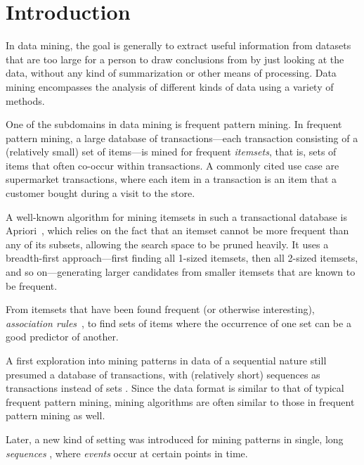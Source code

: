 \chapter{Introduction}

In data mining, the goal is generally to extract useful information from datasets that are too large for a person to draw conclusions from by just looking at the data, without any kind of summarization or other means of processing. Data mining encompasses the analysis of different kinds of data using a variety of methods.


One of the subdomains in data mining is frequent pattern mining. In frequent pattern mining, a large database of transactions---each transaction consisting of a (relatively small) set of items---is mined for frequent \emph{itemsets}, that is, sets of items that often co-occur within transactions. A commonly cited use case are supermarket transactions, where each item in a transaction is an item that a customer bought during a visit to the store.

A well-known algorithm for mining itemsets in such a transactional database is Apriori~\citep{agrawal1994fast}, which relies on the fact that an itemset cannot be more frequent than any of its subsets, allowing the search space to be pruned heavily. It uses a breadth-first approach---first finding all 1-sized itemsets, then all 2-sized itemsets, and so on---gen\-er\-at\-ing larger candidates from smaller itemsets that are known to be frequent.

From itemsets that have been found frequent (or otherwise interesting), \emph{association rules}~\cite{agrawal1994fast}, to find sets of items where the occurrence of one set can be a good predictor of another.


A first exploration into mining patterns in data of a sequential nature still presumed a database of transactions, with (relatively short) sequences as transactions instead of sets \citep{agrawal1995mining}.
Since the data format is similar to that of typical frequent pattern mining, mining algorithms are often similar to those in frequent pattern mining as well.


Later, a new kind of setting was introduced for mining patterns in single, long \emph{sequences} \citep{mannila1997discovery}, where \emph{events} occur at certain points in time.


